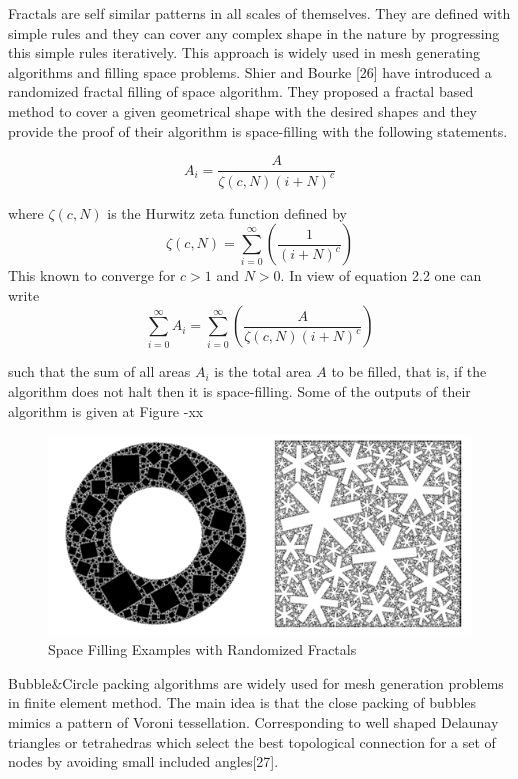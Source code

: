 Fractals are self similar  patterns in all scales of themselves. They are defined with simple rules and they can cover any complex shape in the nature by progressing this simple rules iteratively. This approach is widely used in mesh generating algorithms and filling space problems.  Shier and Bourke [26] have introduced a randomized fractal filling of space algorithm. They proposed a fractal based method to cover a given geometrical shape with the desired shapes and they provide the proof of their algorithm is space-filling with the following statements. 

	\begin{equation} %
	A_i = {\frac{A}{{\zeta(c,N)(i+N)^c}}}
	\end{equation}	
	
	where ${\zeta(c,N)}$ is the Hurwitz zeta function defined by 
	\begin{equation}
	\zeta(c,N) = \sum_{i=0}^{\infty}\left(\frac{1}{(i+N)^c}\right)
	\end{equation}
	This known to converge for $c>1$ and $N>0$. In view of equation 2.2 one can write
	\begin{equation}
	\sum_{i=0}^{\infty}A_i = \sum_{i = 0}^{\infty}\left(\frac{A}{\zeta(c,N)(i+N)^c}\right)
	\end{equation}


such that the sum of all areas $A_i$ is the total area $A$ to be filled, that is, if the algorithm does not halt then it is space-filling. 
Some of the outputs of their algorithm is given at Figure -xx



\begin{figure}[H]
	\caption{Space Filling Examples with Randomized Fractals}
	\centering
	\includegraphics[scale = 1]{randomized1}
\end{figure}


Bubble$\&$Circle packing algorithms are widely used for mesh generation problems in finite element method. The main idea is that the close packing of bubbles mimics a pattern of Voroni tessellation. Corresponding to well shaped Delaunay triangles or tetrahedras which select the best topological connection for a set of nodes by avoiding small included angles[27].


